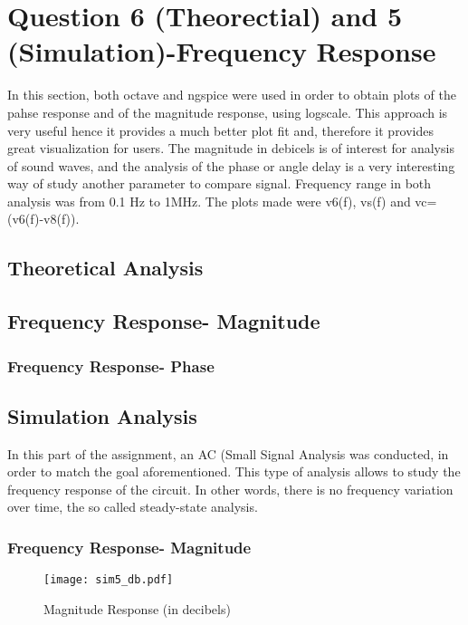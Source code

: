 \section{Question 6 (Theorectial) and 5 (Simulation)-Frequency Response}
In this section, both octave and ngspice were used in order to obtain plots of the pahse response and of the magnitude response, using logscale. This approach is very useful hence it provides a much better plot fit and, therefore it provides great visualization for users. The magnitude in debicels is of interest for analysis of sound waves, and the analysis of the phase or angle delay is a very interesting way of study another parameter to compare signal. Frequency range in both analysis was from 0.1 Hz to 1MHz. The plots made were v6(f), vs(f) and vc=(v6(f)-v8(f)).
\subsection{Theoretical Analysis}

\subsection{Frequency Response- Magnitude}
\subsubsection{Frequency Response- Phase}







\subsection{Simulation Analysis}
In this part of the assignment, an AC (Small Signal Analysis was conducted, in order to match the goal aforementioned. This type of analysis allows to study the frequency response of the circuit. In other words, there is no frequency variation over time, the so called steady-state analysis.


\subsubsection{Frequency Response- Magnitude}

\begin{figure}[ht] \centering
\texttt{[image: sim5\_db.pdf]}
\caption{Magnitude Response (in decibels)}
\label{fig:sim5_db}
\end{figure}

